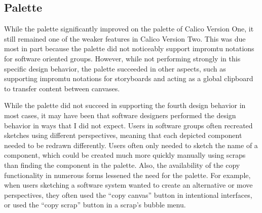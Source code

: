 	

\subsection{Palette}

While the palette significantly improved on the palette of Calico Version One, it still remained one of the weaker features in Calico Version Two. This was due most in part because the palette did not noticeably support impromtu notations for software oriented groups. However, while not performing strongly in this specific design behavior, the palette succeeded in other aspects, such as supporting impromtu notations for storyboards and acting as a global clipboard to transfer content between canvases.

While the palette did not succeed in supporting the fourth design behavior in most cases, it may have been that software designers performed the design behavior in ways that I did not expect. Users in software groups often recreated sketches using different perspectives, meaning that each depicted component needed to be redrawn differently. Users often only needed to sketch the name of a component, which could be created much more quickly manually using scraps than finding the component in the palette. Also, the availability of the copy functionality in numerous forms lessened the need for the palette. For example, when users sketching a software system wanted to create an alternative or move perspectives, they often used the ``copy canvas'' button in intentional interfaces, or used the ``copy scrap'' button in a scrap's bubble menu.

